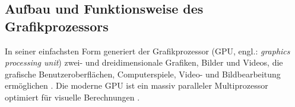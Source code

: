 \documentclass[crop=false]{standalone}
\begin{document}

    \subsection{Aufbau und Funktionsweise des Grafikprozessors} %
    \label{sub:aufbau_und_funktionsweise_des_grafikprozessors}
      In seiner einfachsten Form generiert der Grafikprozessor (GPU, engl.: \textit{graphics processing unit}) zwei- und dreidimensionale Grafiken, Bilder und Videos, die grafische Benutzeroberflächen, Computerspiele, Video- und Bildbearbeitung ermöglichen \cite[S.~A3]{Patterson2011}.
      Die moderne GPU ist ein massiv paralleler Multiprozessor optimiert für visuelle Berechnungen \cite[S.~A3]{Patterson2011}.

\end{document}
